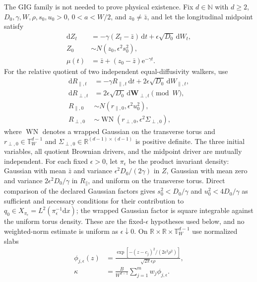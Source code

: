 \documentclass[aps,physrev,reprint,amsmath,amssymb,longbibliography,floatfix]{revtex4-2}
\newcommand{\dd}{\mathrm d}
\newcommand{\e}{\mathrm e}
\begin{document}
The GIG family is not needed to prove physical existence.  Fix
$d\in\mathbb N$ with $d\ge2$, $D_0,\gamma,W,\rho,s_0,u_0>0$,
$0<a<W/2$, and
$z_0\ne\bar z$, and let the longitudinal midpoint satisfy
\begin{equation}
\begin{aligned}
 \dd Z_t&=-\gamma(Z_t-\bar z)\,\dd t
          +\epsilon\sqrt{D_0}\,\dd W_t,\\
 Z_0&\sim N(z_0,\epsilon^2s_0^2),\\
 \mu(t)&=\bar z+(z_0-\bar z)\e^{-\gamma t}.
\end{aligned}
\label{eq:narrowou}
\end{equation}
For the relative quotient of two independent equal-diffusivity walkers, use
\begin{align}
 \dd R_{\parallel,t}&=-\gamma R_{\parallel,t}\,\dd t
 +2\epsilon\sqrt{D_0}\,\dd W_{\parallel,t},\nonumber\\
 \dd R_{\perp,t}&=2\epsilon\sqrt{D_0}\,\dd\bm W_{\perp,t}
 \pmod W,\nonumber\\
 R_{\parallel,0}&\sim
 N(r_{\parallel,0},\epsilon^2u_0^2),\nonumber\\
 R_{\perp,0}&\sim \operatorname{WN}
 (r_{\perp,0},\epsilon^2\Sigma_{\perp,0}),
\label{eq:relativequotient}
\end{align}
where $\operatorname{WN}$ denotes a wrapped Gaussian on the transverse torus
and $r_{\perp,0}\in\mathbb T_W^{d-1}$ and
$\Sigma_{\perp,0}\in\mathbb R^{(d-1)\times(d-1)}$ is positive definite.
The three initial variables, all quotient
Brownian drivers, and the midpoint driver are mutually independent.  For each
fixed $\epsilon>0$, let $\pi_\epsilon$ be the product invariant density:
Gaussian with mean $\bar z$ and variance $\epsilon^2D_0/(2\gamma)$ in $Z$,
Gaussian with mean zero and variance $2\epsilon^2D_0/\gamma$ in
$R_\parallel$, and uniform on the transverse torus.  Direct comparison of the
declared Gaussian factors gives
$s_0^2<D_0/\gamma$ and $u_0^2<4D_0/\gamma$ as sufficient and necessary
conditions for their contribution to
$q_0\in X_{\pi_\epsilon}=L^2(\pi_\epsilon^{-1}\dd x)$; the wrapped Gaussian
factor is square integrable against the uniform torus density.  These are the
fixed-$\epsilon$ hypotheses used below, and no weighted-norm estimate is
uniform as $\epsilon\downarrow0$.  On
$\mathbb R\times\mathbb R\times\mathbb T_W^{d-1}$ use normalized slabs
\begin{align}
 \phi_{j,\epsilon}(z)
 &=\frac{\exp[-(z-c_j)^2/(2\epsilon^2\rho^2)]}
 {\sqrt{2\pi}\epsilon\rho},\nonumber\\
 \kappa&=\frac{B}{W^{d-1}}
 \sum_{j=1}^{m}w_j\phi_{j,\epsilon}.
\label{eq:narrowslabs}
\end{align}
\end{document}

